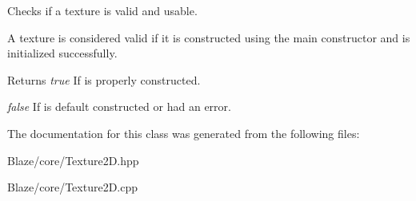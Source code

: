 Checks if a texture is valid and usable. 

A texture is considered valid if it is constructed using the main constructor and is initialized successfully.

\begin{DoxyReturn}{Returns}
{\itshape true} If is properly constructed. 

{\itshape false} If is default constructed or had an error. 
\end{DoxyReturn}


The documentation for this class was generated from the following files\+:\begin{DoxyCompactItemize}
\item 
Blaze/core/Texture2\+D.\+hpp\item 
Blaze/core/Texture2\+D.\+cpp\end{DoxyCompactItemize}
